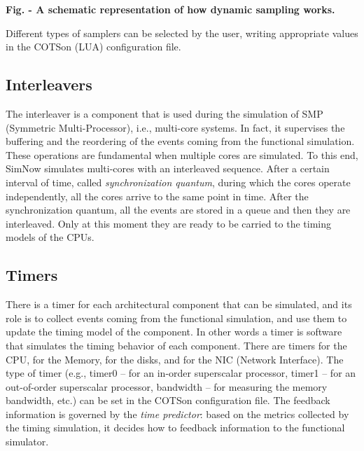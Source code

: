 \documentclass[a4paper]{article}
\newcounter{Figure}
\renewcommand\theFigure{\arabic{Figure}}
\begin{document}
{\centering{}\sffamily\bfseries
\label{bkm:Ref388170462}Fig.
\stepcounter{Figure}{\theFigure} - A schematic representation of how
dynamic sampling works.
\par}

{
Different types of samplers can be selected by the user, writing
appropriate values in the COTSon (LUA) configuration file. }

\subsection[Interleavers]{Interleavers}
{
The interleaver is a component that is used during the simulation of SMP
(Symmetric Multi-Processor), i.e., multi-core systems. In fact, it
supervises the buffering and the reordering of the events coming from
the functional simulation. These operations are fundamental when
multiple cores are simulated. To this end, SimNow simulates multi-cores
with an interleaved sequence. After a certain interval of time, called
\textit{synchronization quantum}, during which the cores operate
independently, all the cores arrive to the same point in time. After
the synchronization quantum, all the events are stored in a queue and
then they are interleaved. Only at this moment they are ready to be
carried to the timing models of the CPUs.}

\subsection[Timers]{Timers}
{
There is a timer for each architectural component that can be simulated,
and its role is to collect events coming from the functional
simulation, and use them to update the timing model of the component.
In other words a timer is software that simulates the timing behavior
of each component. There are timers for the CPU, for the Memory, for
the disks, and for the NIC (Network Interface). The type of timer
(e.g., timer0 -- for an in-order superscalar processor, timer1 -- for
an out-of-order superscalar processor, bandwidth -- for measuring the
memory bandwidth, etc.) can be set in the COTSon configuration file.
The feedback information is governed by the \textit{time predictor}:
based on the metrics collected by the timing simulation, it decides how
to feedback information to the functional simulator.}
\end{document}
